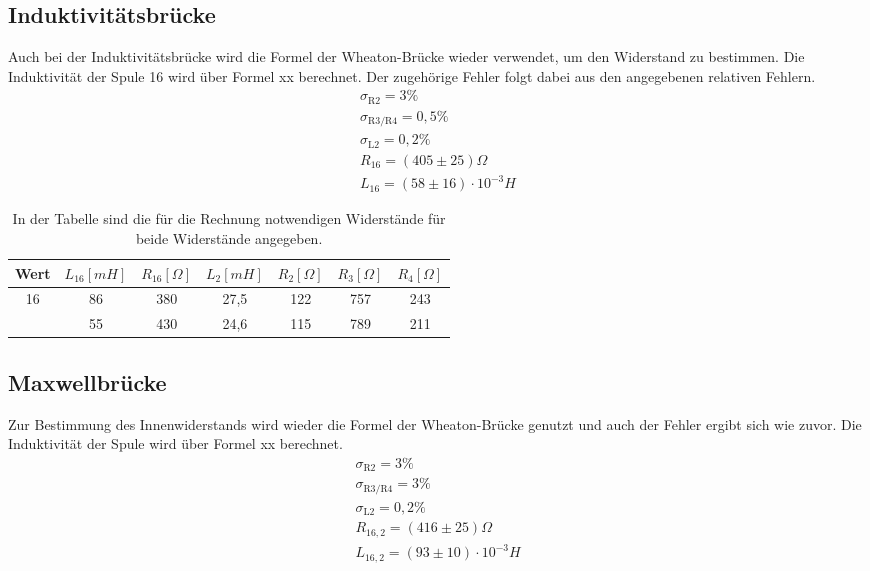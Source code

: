 \documentclass[titlepage = firstcover]{scrartcl}
\begin{document}
  \subsection{Induktivitätsbrücke}
  Auch bei der Induktivitätsbrücke wird die Formel der Wheaton-Brücke wieder verwendet, um den Widerstand zu bestimmen. Die Induktivität der Spule 16 wird
  über Formel xx berechnet. Der zugehörige Fehler folgt dabei aus den angegebenen relativen Fehlern.
  \begin{align*}
    \sigma_{\text{R2}} = 3 \% \\
    \sigma_{\text{R3/R4}} = 0,5 \% \\
    \sigma_{\text{L2}} = 0,2 \% \\
    R_{16} = (405 \pm 25) \Omega\\
    L_{16} = (58 \pm 16) \cdot 10^{-3} H
  \end{align*}

  \begin{table}[h]
    \centering
    \caption{In der Tabelle sind die für die Rechnung notwendigen Widerstände für beide Widerstände angegeben.}
    \label{tab:Indu}
    \begin{tabular}{c c c c c c c}
      \toprule
      {Wert} & {$L_{\text{16}} [mH]$} & {$R_{\text{16}} [\Omega]$} & {$L_{\text{2}} [mH]$} & {$R_{\text{2}} [\Omega]$} & {$R_{\text{3}} [\Omega]$} & {$R_{\text{4}} [\Omega]$} \\
      \midrule 
      16 & 86 & 380 & 27,5 & 122 & 757 & 243  \\
       & 55 & 430 & 24,6 & 115 & 789 & 211 \\
      \bottomrule
    \end{tabular}
  \end{table}

  \subsection{Maxwellbrücke}
  Zur Bestimmung des Innenwiderstands wird wieder die Formel der Wheaton-Brücke genutzt und auch der Fehler ergibt sich wie zuvor. Die Induktivität der Spule
  wird über Formel xx berechnet.
  \begin{align*}
    \sigma_{\text{R2}} = 3 \% \\
    \sigma_{\text{R3/R4}} = 3 \% \\
    \sigma_{\text{L2}} = 0,2 \% \\
    R_{16,2} = (416 \pm 25) \Omega\\
    L_{16,2} = (93 \pm 10) \cdot 10^{-3} H
  \end{align*}
\end{document}
